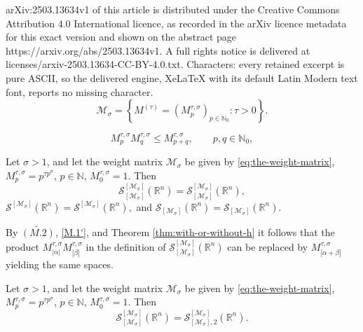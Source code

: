 \documentclass[10pt,a4paper]{amsart}
\begin{document}
arXiv:2503.13634v1 of this article is distributed under the Creative Commons Attribution 4.0 International licence, as recorded in the arXiv licence metadata for this exact version and shown on the abstract page https://arxiv.org/abs/2503.13634v1. A full rights notice is delivered at licenses/arxiv-2503.13634-CC-BY-4.0.txt. Characters: every retained excerpt is pure ASCII, so the delivered engine, XeLaTeX with its default Latin Modern text font, reports no missing character.
    \begin{equation}\label{eq:the-weight-matrix}
\mathcal{M}_\sigma=\left\{M^{(\tau)} =  (M_{p}^{\tau,\sigma})_{p\in\mathbb N_0}\colon \tau>0\right\}.
    \end{equation}

\begin{equation} \label{M.1'}
M_p^{\tau,\sigma}M_q^{\tau,\sigma}\leq M_{p+q}^{\tau,\sigma},\qquad p,q\in\mathbb N_0,
\end{equation}

\begin{Theorem} \label{thm:with-or-without-h}
Let $\sigma>1$, and let the weight matrix $\mathcal{M}_\sigma$ be given by 
\eqref{eq:the-weight-matrix}, 
$ M_{p}^{\tau,\sigma}=p^{\tau p^\sigma}$, $ p\in \mathbb{N}$, $ M_0^{\tau,\sigma}=1$.
Then 
\begin{equation}
\mathcal S_{[\mathcal{M}_\sigma ] }^{ [\mathcal{M}_\sigma]} (\mathbb R^n)
= \mathscr S_{[\mathcal{M}_\sigma ] }^{ [\mathcal{M}_\sigma ]} (\mathbb R^n),    
\end{equation}
$\mathcal S^{ [\mathcal{M}_\sigma]} (\mathbb R^n)
= \mathscr S^{ [\mathcal{M}_\sigma ]} (\mathbb R^n),$
and 
$\mathcal S_{[\mathcal{M}_\sigma ] } (\mathbb R^n)
= \mathscr S_{[\mathcal{M}_\sigma ] } (\mathbb R^n).$
\end{Theorem}

\begin{Remark} \label{rem:alfa-beta}
By  $\widetilde{(M.2)}$, \eqref{M.1'}, and Theorem \ref{thm:with-or-without-h}
it follows that the product $M^{\tau, \sigma} _{|\alpha|} 
  M^{\tau, \sigma} _{|\beta|}$ in the definition of 
$\mathcal S_{[\mathcal{M}_\sigma ] }^{ [\mathcal{M}_\sigma]} (\mathbb R^n)$ can be replaced by $M^{\tau, \sigma} _{|\alpha + \beta|}$ yielding the same spaces.
 \end{Remark}

\begin{Theorem} \label{thm:L2-and-Linfty}
Let $\sigma>1$, and let the weight matrix $\mathcal{M}_\sigma$ be given by 
\eqref{eq:the-weight-matrix}, 
$ M_{p}^{\tau,\sigma}=p^{\tau p^\sigma}$, $ p\in \mathbb{N}$, $ M_0^{\tau,\sigma}=1$.
Then 
\begin{equation}
\mathcal S_{[\mathcal{M}_\sigma ] }^{ [\mathcal{M}_\sigma]} (\mathbb R^n)
=  \mathcal S_{[\mathcal{M}_\sigma],2}^{[\mathcal{M}_\sigma]} (\mathbb R^n).    \label{eq:L2-and-Linfty}
\end{equation}
\end{Theorem}
\end{document}
